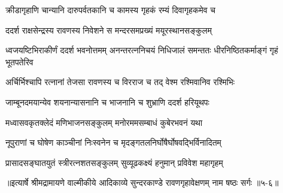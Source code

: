 \twolineshloka
{क्रीडागृहाणि चान्यानि दारुपर्वतकानि च}
{कामस्य गृहकं रम्यं दिवागृहकमेव च} %

\twolineshloka
{ददर्श राक्षसेन्द्रस्य रावणस्य निवेशने}
{स मन्दरसमप्रख्यं मयूरस्थानसङ्कुलम्} %

\threelineshloka
{ध्वजयष्टिभिराकीर्णं ददर्श भवनोत्तमम्}
{अनन्तरत्ननिचयं निधिजालं समन्ततः}
{धीरनिष्ठितकर्माङ्गं गृहं भूतपतेरिव} %

\twolineshloka
{अर्चिर्भिश्चापि रत्नानां तेजसा रावणस्य च}
{विरराज च तद् वेश्म रश्मिवानिव रश्मिभिः} %

\twolineshloka
{जाम्बूनदमयान्येव शयनान्यासनानि च}
{भाजनानि च शुभ्राणि ददर्श हरियूथपः} %

\twolineshloka
{मध्वासवकृतक्लेदं मणिभाजनसङ्कुलम्}
{मनोरममसम्बाधं कुबेरभवनं यथा} %

\twolineshloka
{नूपुराणां च घोषेण काञ्चीनां निःस्वनेन च}
{मृदङ्गतलनिर्घोषैर्घोषवद्भिर्विनादितम्} %

\twolineshloka
{प्रासादसङ्घातयुतं स्त्रीरत्नशतसङ्कुलम्}
{सुव्यूढकक्ष्यं हनुमान् प्रविवेश महागृहम्} %


॥इत्यार्षे श्रीमद्रामायणे वाल्मीकीये आदिकाव्ये सुन्दरकाण्डे रावणगृहावेक्षणम् नाम षष्ठः सर्गः ॥५-६॥
